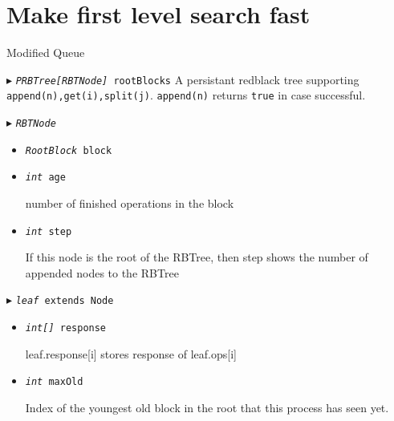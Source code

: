 \documentclass[10pt]{article}
\theoremstyle{definition}
\begin{document}
\section{Make first level search fast}
\begin{algorithm}
\caption{Modified Queue \label{algQx}}
\begin{algorithmic}[1]
\begin{multicols}{2}






\Statex $\blacktriangleright$ \texttt{\textsl{PRBTree[RBTNode]} rootBlocks}
  \Statex \textsf{A persistant redblack tree supporting \texttt{append(n),get(i),split(j)}}. \texttt{append(n)} returns \texttt{true} in case successful.


\Statex $\blacktriangleright$ \texttt{\textsl{RBTNode}}
\begin{itemize}

  \item \texttt{\textsl{RootBlock} block}



  \item \texttt{\textsl{int} age}
  
  \textsf{number of finished operations in the block}

  \item \texttt{\textsl{int} step}
  
  \textsf{If this node is the root of the RBTree, then step shows the number of appended nodes to the RBTree}

  

\end{itemize}


\Statex $\blacktriangleright$ \texttt{\textsl{leaf} extends Node}
\begin{itemize}
  \item \texttt{\textsl{int[]} response}
  
  \textsf{leaf.response[i] stores response of leaf.ops[i]}
  
  \item \texttt{\textsl{int} maxOld}

  \textsf{Index of the youngest old block in the root that this process has seen yet.}
  

\end{itemize}
\end{multicols}
\end{algorithmic}
\end{algorithm}
\end{document}
